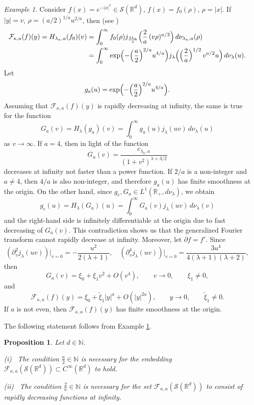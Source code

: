 \documentclass[12pt,twoside,reqno]{amsart}\usepackage[cp1251]{inputenc}
\theoremstyle{plain}
\newtheorem{proposition}[theorem]{Proposition}
\theoremstyle{remark}
\newtheorem{example}[theorem]{Example}
\begin{document}
\begin{example}\label{exa1}
Consider  $f(x)=e^{-|x|^2}\in\mathcal{S}(\mathbb{R}^d)$, $f(x)=f_0(\rho)$, $\rho=|x|$.
If $|y|=v$, $\rho=(a/2)^{1/a}u^{2/a}$, then (see \cite{SKO12,GIT16})
\begin{align*}
\mathcal{F}_{\kappa,a}(f)(y)=H_{\lambda_{\kappa},a}(f_0)(v)&=
\int_{0}^{\infty}f_0(\rho)j_{\frac{2\lambda_{\kappa}}{a}}\Bigl(\frac{2}{a}\,(v\rho)^{a/2} \Bigr)\,d\nu_{\lambda_{\kappa},a}(\rho)\\
&=\int_{0}^{\infty}\exp \Bigl(-\Bigl(\frac{a}{2}\Bigr)^{2/a}u^{4/a}\Bigr)j_{\lambda}
\Bigl(\Bigl(\frac{2}{a}\Bigr)^{1/2}\,v^{a/2}u\Bigr)\,d\nu_{\lambda}(u).
\end{align*}
Let
\[
g_a(u)=\exp \Bigl(-\Bigl(\frac{a}{2}\Bigr)^{2/a}u^{4/a}\Bigr).
\]
Assuming that  $\mathcal{F}_{\kappa,a}(f)(y)$ is rapidly decreasing at infinity, the same is true for the function
\[
G_a(v)=H_{\lambda}(g_a)(v)=\int_{0}^{\infty}g_a(u)j_{\lambda}(uv)\,d\nu_{\lambda}(u)
\]
as $v\to\infty$. If $a=4$, then in light of \cite[Chap.~VIII, 8.6(4)]{Ba54} the function
\[
G_a(v)=\frac{c_{\lambda_{\kappa},a}}{(1+v^2)^{\lambda+3/2}}
\]
decreases at infinity not faster than a power function.
If $2/a$ is a non-integer and  $a\neq
4$, then  $4/a$ is also non-integer, and therefore $g_a(u)$
has finite smoothness at the origin.
On the other hand, since  $g_e,G_a\in L^1(\mathbb{R}_+,d\nu_{\lambda})$, we obtain
\[
g_e(u)=H_{\lambda}(G_a)(u)=\int_{0}^{\infty}G_a(v)j_{\lambda}(uv)\,d\nu_{\lambda}(v)
\]
and the right-hand side is infinitely differentiable at the origin due to fast decreasing of $G_a(v)$.
This contradiction shows us that the generalized Fourier transform  cannot rapidly decrease at infinity.
Moreover, let $\partial f=f'$. Since
\[
(\partial_v^2j_{\lambda}(uv))\bigr|_{v=0}=-\frac{u^2}{2(\lambda+1)},\quad (\partial_v^4j_{\lambda}(uv))\bigr|_{v=0}=\frac{3u^4}{4(\lambda+1)(\lambda+2)},
\]
then %
\[
G_a(v)=\xi_0+\xi_1v^2+O(v^4),\qquad v\to 0,\qquad
 \xi_1\neq 0,
\]
and
\[
\mathcal{F}_{\kappa,a}(f)(y)=\xi_0+\widetilde{\xi}_1|y|^a+O(|y|^{2a}),\qquad y\to 0,\qquad \widetilde{\xi}_1\neq 0.
\]
If $a$ is not  even, then $\mathcal{F}_{\kappa,a}(f)(y)$ has finite smoothness at the origin.
\end{example}

The following statement follows from Example \ref{exa1}.

\begin{proposition}\label{lem6}
Let $d\in\mathbb{N}$.

\smallbreak
\textup{(i)} \
The condition $\frac{a}{2}\in\mathbb{N}$ is necessary for the embedding $\mathcal{F}_{\kappa,a}(\mathcal{S}(\mathbb{R}^d))\subset C^{\infty}(\mathbb{R}^d)$ to hold.

\smallbreak
\textup{(ii)} \
The condition $\frac{2}{a}\in\mathbb{N}$ is necessary for the set $\mathcal{F}_{\kappa,a}(\mathcal{S}(\mathbb{R}^d))$ to consist of rapidly decreasing functions at infinity.

\end{proposition}
\end{document}
